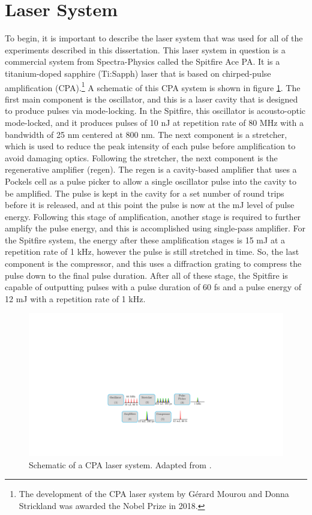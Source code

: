 \section{Laser System}
\label{sec:laser_system}
To begin, it is important to describe the laser system that was used for all of the experiments described in this dissertation.  This laser system in question is a commercial system from Spectra-Physics called the Spitfire Ace PA.  It is a titanium-doped sapphire (Ti:Sapph) laser that is based on chirped-pulse amplification (CPA).\footnote{The development of the CPA laser system by Gérard Mourou and Donna Strickland was awarded the Nobel Prize in 2018.}  A schematic of this CPA system is shown in figure \ref{fig:CPA}.  The first main component is the oscillator, and this is a laser cavity that is designed to produce pulses via mode-locking.  In the Spitfire, this oscillator is acousto-optic mode-locked, and it produces pulses of 10 nJ at repetition rate of 80 MHz with a bandwidth of 25 nm centered at 800 nm.  The next component is a stretcher, which is used to reduce the peak intensity of each pulse before amplification to avoid damaging optics.  Following the stretcher, the next component is the regenerative amplifier (regen).  The regen is a cavity-based amplifier that uses a Pockels cell as a pulse picker to allow a single oscillator pulse into the cavity to be amplified.  The pulse is kept in the cavity for a set number of round trips before it is released, and at this point the pulse is now at the mJ level of pulse energy.  Following this stage of amplification, another stage is required to further amplify the pulse energy, and this is accomplished using single-pass amplifier.  For the Spitfire system, the energy after these amplification stages is 15 mJ at a repetition rate of 1 kHz, however the pulse is still stretched in time.  So, the last component is the compressor, and this uses a diffraction grating to compress the pulse down to the final pulse duration.  After all of these stage, the Spitfire is capable of outputting pulses with a pulse duration of 60 fs and a pulse energy of 12 mJ with a repetition rate of 1 kHz.

\begin{figure}
	\centering
	\includegraphics[width=1.0\textwidth]{figures/Beamline/CPA.pdf}
	\caption[Schematic of a CPA laser system]{Schematic of a CPA laser system. Adapted from \cite{kiesewetterDynamicsNearThresholdAttosecond2019}. }
	\label{fig:CPA}
\end{figure}

